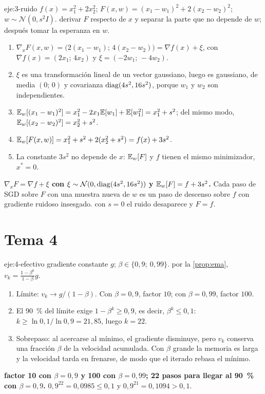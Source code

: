 \begin{solucion}{eje:3-ruido}
\datos $f(x)=x_1^{2}+2x_2^{2}$; $F(x,w)=(x_1-w_1)^{2}+2(x_2-w_2)^{2}$; $w\sim\mathcal{N}(0,s^{2}I)$.
\planteamiento derivar $F$ respecto de $x$ y separar la parte que no depende de $w$; después tomar la esperanza en $w$.
\pasos
\begin{enumerate}[label=\arabic*.]
  \item $\nabla_xF(x,w)=\bigl(2(x_1-w_1);\,4(x_2-w_2)\bigr)=\nabla f(x)+\xi$, con $\nabla f(x)=(2x_1;\,4x_2)$ y $\xi=(-2w_1;\,-4w_2)$.
  \item $\xi$ es una transformación lineal de un vector gaussiano, luego es gaussiano, de media $(0;\,0)$ y covarianza $\operatorname{diag}(4s^{2},16s^{2})$, porque $w_1$ y $w_2$ son independientes.
  \item $\mathbb{E}_w[(x_1-w_1)^{2}]=x_1^{2}-2x_1\mathbb{E}[w_1]+\mathbb{E}[w_1^{2}]=x_1^{2}+s^{2}$; del mismo modo, $\mathbb{E}_w[(x_2-w_2)^{2}]=x_2^{2}+s^{2}$.
  \item $\mathbb{E}_w[F(x,w)]=x_1^{2}+s^{2}+2(x_2^{2}+s^{2})=f(x)+3s^{2}$.
  \item La constante $3s^{2}$ no depende de $x$: $\mathbb{E}_w[F]$ y $f$ tienen el mismo minimizador, $x^{\ast}=0$.
\end{enumerate}
\resultado \textbf{$\nabla_xF=\nabla f+\xi$ con $\xi\sim\mathcal{N}(0,\operatorname{diag}(4s^{2},16s^{2}))$ y $\mathbb{E}_w[F]=f+3s^{2}$.} Cada paso de SGD sobre $F$ con una muestra nueva de $w$ es un paso de descenso sobre $f$ con gradiente ruidoso insesgado.
\comprobacion con $s=0$ el ruido desaparece y $F=f$.
\end{solucion}

\section{Tema 4}

\begin{solucion}{eje:4-efectivo}
\datos gradiente constante $g$; $\beta\in\{0{,}9;\ 0{,}99\}$.
\planteamiento por la \cref{prop:ema}, $v_k=\frac{1-\beta^{k}}{1-\beta}g$.
\pasos
\begin{enumerate}[label=\arabic*.]
  \item Límite: $v_k\to g/(1-\beta)$. Con $\beta=0{,}9$, factor $10$; con $\beta=0{,}99$, factor $100$.
  \item El 90~\% del límite exige $1-\beta^{k}\ge 0{,}9$, es decir, $\beta^{k}\le 0{,}1$: $k\ge\ln 0{,}1/\ln 0{,}9=21{,}85$, luego $k=22$.
  \item Sobrepaso: al acercarse al mínimo, el gradiente disminuye, pero $v_k$ conserva una fracción $\beta$ de la velocidad acumulada. Con $\beta$ grande la memoria es larga y la velocidad tarda en frenarse, de modo que el iterado rebasa el mínimo.
\end{enumerate}
\resultado \textbf{factor 10 con $\beta=0{,}9$ y 100 con $\beta=0{,}99$; 22 pasos para llegar al 90~\% con $\beta=0{,}9$.}
\comprobacion $0{,}9^{22}=0{,}0985\le 0{,}1$ y $0{,}9^{21}=0{,}1094>0{,}1$.
\end{solucion}

